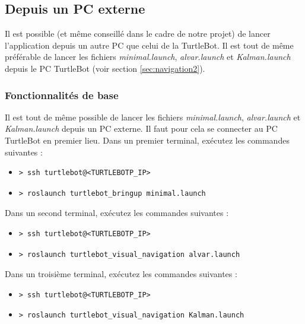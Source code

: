 \documentclass[10pt,a4paper]{article}
\begin{document}
\subsection{Depuis un PC externe}

Il est possible (et même conseillé dans le cadre de notre projet) de lancer l'application depuis un autre PC que celui de la TurtleBot.
Il est tout de même préférable de lancer les fichiers \upshape \emph{minimal.launch}, \upshape \emph{alvar.launch} et \upshape \emph{Kalman.launch} depuis le PC TurtleBot (voir section \ref{sec:navigation2}).

\subsubsection{Fonctionnalités de base}

Il est tout de même possible de lancer les fichiers \upshape \emph{minimal.launch}, \upshape \emph{alvar.launch} et \upshape \emph{Kalman.launch} depuis un PC externe. Il faut pour cela se connecter au PC TurtleBot en premier lieu.
Dans un premier terminal, exécutez les commandes suivantes :

\begin{itemize}
\item[]  \begin{verbatim}> ssh turtlebot@<TURTLEBOTP_IP> \end{verbatim}
\item[]  \begin{verbatim}> roslaunch turtlebot_bringup minimal.launch \end{verbatim}
\end{itemize}

Dans un second terminal, exécutez les commandes suivantes :

\begin{itemize}
\item[]  \begin{verbatim}> ssh turtlebot@<TURTLEBOTP_IP> \end{verbatim}
\item[]  \begin{verbatim}> roslaunch turtlebot_visual_navigation alvar.launch \end{verbatim}
\end{itemize}

Dans un troisième terminal, exécutez les commandes suivantes :

\begin{itemize}
\item[]  \begin{verbatim}> ssh turtlebot@<TURTLEBOTP_IP> \end{verbatim}
\item[]  \begin{verbatim}> roslaunch turtlebot_visual_navigation Kalman.launch \end{verbatim}
\end{itemize}
\end{document}

